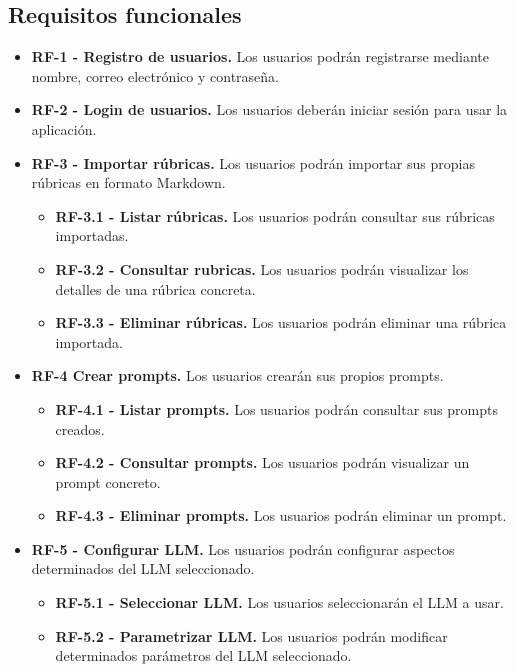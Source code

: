 \subsection{Requisitos funcionales}
\begin{itemize}
    \item \textbf{RF-1 - Registro de usuarios.} Los usuarios podrán registrarse mediante nombre, correo electrónico y contraseña.
    \item \textbf{RF-2 - Login de usuarios.} Los usuarios deberán iniciar sesión para usar la aplicación.
    \item \textbf{RF-3 - Importar rúbricas.} Los usuarios podrán importar sus propias rúbricas en formato Markdown.
    \begin{itemize}
        \item \textbf{RF-3.1 - Listar rúbricas.} Los usuarios podrán consultar sus rúbricas importadas.
        \item \textbf{RF-3.2 - Consultar rubricas.} Los usuarios podrán visualizar los detalles de una rúbrica concreta.
        \item \textbf{RF-3.3 - Eliminar rúbricas.} Los usuarios podrán eliminar una rúbrica importada.
    \end{itemize}
    \item \textbf{RF-4 Crear prompts.} Los usuarios crearán sus propios prompts.
    \begin{itemize}
        \item \textbf{RF-4.1 - Listar prompts.} Los usuarios podrán consultar sus prompts creados.
        \item \textbf{RF-4.2 - Consultar prompts.} Los usuarios podrán visualizar un prompt concreto.
        \item \textbf{RF-4.3 - Eliminar prompts.} Los usuarios podrán eliminar un prompt.
    \end{itemize}
    \item \textbf{RF-5 - Configurar LLM.} Los usuarios podrán configurar aspectos determinados del LLM seleccionado.
    \begin{itemize}
        \item \textbf{RF-5.1 - Seleccionar LLM.} Los usuarios seleccionarán el LLM a usar.
        \item \textbf{RF-5.2 - Parametrizar LLM.} Los usuarios podrán modificar determinados parámetros del LLM seleccionado.
    \end{itemize}
\end{itemize}

